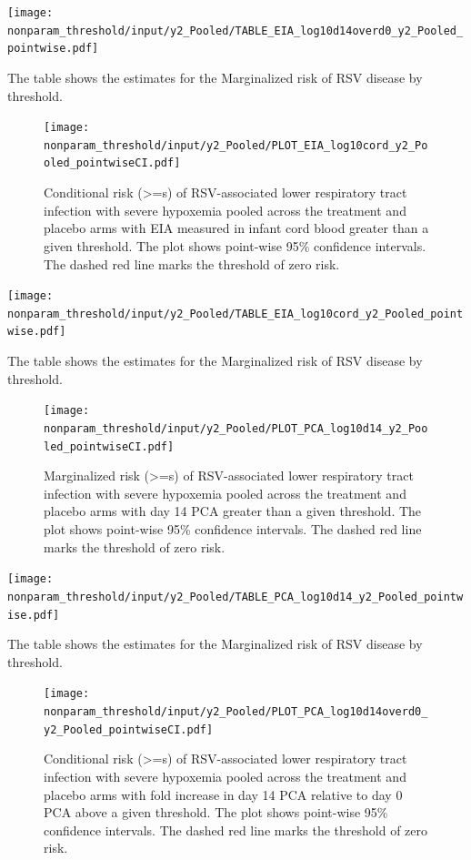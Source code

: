 \documentclass[11pt]{article}
\begin{document}
\begin{table}[H]
\centering
\texttt{[image: nonparam\_threshold/input/y2\_Pooled/TABLE\_EIA\_log10d14overd0\_y2\_Pooled\_pointwise.pdf]}
\caption{The table shows the  estimates for the Marginalized risk of RSV disease by threshold. }
\end{table}

\begin{figure}[H]
\centering
\texttt{[image: nonparam\_threshold/input/y2\_Pooled/PLOT\_EIA\_log10cord\_y2\_Pooled\_pointwiseCI.pdf]}
\caption{Conditional risk (>=s) of RSV-associated lower respiratory tract infection with severe hypoxemia pooled across the treatment and placebo arms with EIA measured in infant cord blood greater than a given threshold. The plot shows point-wise 95\% confidence intervals. The dashed red line marks the threshold of zero risk.}
\end{figure}

\begin{table}[H]
\centering
\texttt{[image: nonparam\_threshold/input/y2\_Pooled/TABLE\_EIA\_log10cord\_y2\_Pooled\_pointwise.pdf]}
\caption{The table shows the  estimates for the Marginalized risk of RSV disease by threshold. }
\end{table}

\begin{figure}[H]
\centering
\texttt{[image: nonparam\_threshold/input/y2\_Pooled/PLOT\_PCA\_log10d14\_y2\_Pooled\_pointwiseCI.pdf]}
\caption{Marginalized risk (>=s) of RSV-associated lower respiratory tract infection with severe hypoxemia pooled across the treatment and placebo arms with day 14 PCA greater than a given threshold. The plot shows point-wise 95\% confidence intervals. The dashed red line marks the threshold of zero risk.}
\end{figure}

\begin{table}[H]
\centering
\texttt{[image: nonparam\_threshold/input/y2\_Pooled/TABLE\_PCA\_log10d14\_y2\_Pooled\_pointwise.pdf]}
\caption{The table shows the  estimates for the Marginalized risk of RSV disease by threshold. }
\end{table}

\begin{figure}[H]
\centering
\texttt{[image: nonparam\_threshold/input/y2\_Pooled/PLOT\_PCA\_log10d14overd0\_y2\_Pooled\_pointwiseCI.pdf]}
\caption{Conditional risk (>=s) of RSV-associated lower respiratory tract infection with severe hypoxemia pooled across the treatment and placebo arms with fold increase in day 14 PCA relative to day 0 PCA above a given threshold. The plot shows point-wise 95\% confidence intervals. The dashed red line marks the threshold of zero risk.}
\end{figure}
\end{document}
